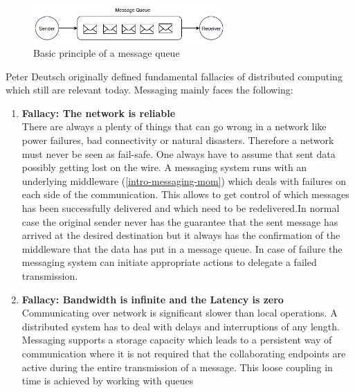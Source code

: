 \begin{figure}[H]
    \centering
    \includegraphics[width=0.65\textwidth]{images/messaging-simple.png}
    \caption{Basic principle of a message queue}
    \label{fig:messaging-simple}
\end{figure}
\newpage
Peter Deutsch originally defined fundamental fallacies of distributed computing
 which still are relevant today. Messaging mainly faces the
following:

\begin{enumerate}
    \item{\textbf{Fallacy: The network is reliable} \hfill \\
        There are always a plenty of things that can go wrong in a network
       like power failures, bad connectivity or natural disasters. Therefore a
       network must never be seen as fail-safe. One always have to assume
       that sent data possibly getting lost on the wire. A messaging system
       runs with an underlying middleware (\ref{intro-messaging-mom})
       which deals with failures on each side of the communication. This allows to
       get control of which messages has been successfully delivered and which
       need to be redelivered.In normal case the original sender never has the
       guarantee that the sent message has arrived at the desired destination
       but it always has the confirmation of the middleware that the data has put in a
       message queue. In case of failure the messaging system can initiate
       appropriate actions to delegate a failed transmission.}   
    \item{\textbf{Fallacy: Bandwidth is infinite and the Latency is zero } \hfill \\
        Communicating over network is significant slower than local operations.
        A distributed system has to deal with delays and interruptions of any
        length. Messaging supports a storage capacity which leads to a
        persistent way of communication where it is not required that the
        collaborating endpoints are active during the entire transmission of a
        message. This loose coupling in time is achieved by working with queues
}
\end{enumerate}
